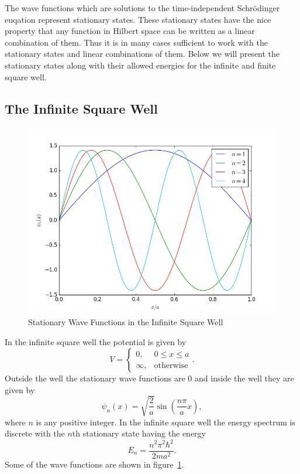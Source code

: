 \documentclass[12pt,a4paper]{article}
\begin{document}
The wave functions which are solutions to the time-independent Schrödinger euqation represent stationary states. These stationary states have the nice property that any function in Hilbert space can be written as a linear combination of them. Thus it is in many cases sufficient to work with the stationary states and linear combinations of them. Below we will present the stationary states along with their allowed energies for the infinite and finite square well.

\subsection{The Infinite Square Well}
\begin{figure}
\includegraphics[width=\textwidth]{../Python/ISW_stationarySolutions.png}
\caption{Stationary Wave Functions in the Infinite Square Well}
\label{fig:infiniteSquareWell}
\end{figure}

In the infinite square well the potential is given by
\begin{equation}
V = \begin{cases} 0, & 0 \leq x \leq a \\
                  \infty, & \text{otherwise} \end{cases}.
\end{equation}
Outside the well the stationary wave functions are $0$ and inside the well they are given by
\begin{equation}
\psi_n(x) = \sqrt{\frac{2}{a}} \sin \left( \frac{n \pi}{a} x \right),
\end{equation}
where $n$ is any positive integer. In the infinite square well the energy spectrum is discrete with the $n$th stationary state having the energy
\begin{equation}
E_n = \frac{n^2 \pi^2 \hbar^2}{2 m a^2}.
\end{equation}
Some of the wave functions are shown in figure~\ref{fig:infiniteSquareWell}.
\end{document}
